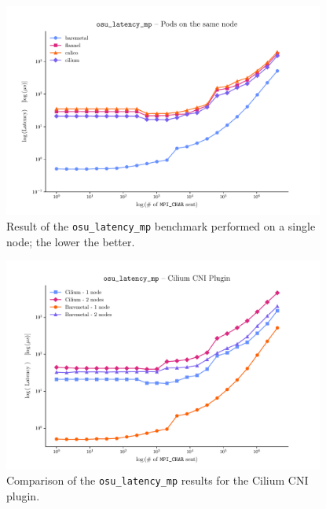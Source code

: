 \begin{figure}
  \centering
  \includegraphics[width=0.94\textwidth]{img/chpt3/latency_mp-1-node}
  \caption{Result of the \texttt{osu\_latency\_mp} benchmark performed on a single
    node; the lower the better.}
  \label{fig:latency-mp-1-node}
\end{figure}


\begin{figure}
  \centering
  \includegraphics[width=0.94\textwidth]{img/chpt3/cilium-latency_mp}
  \caption{Comparison of the \texttt{osu\_latency\_mp} results for the Cilium
    CNI plugin.}
  \label{fig:cilium-latency}
\end{figure}

